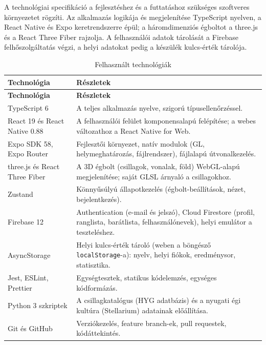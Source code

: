 \documentclass[12pt,a4paper]{article}
\newcommand{\fejlec}{\rowcolor{egkekvil}}
\newcommand{\kod}[1]{\texttt{\small #1}}
\begin{document}
A technológiai specifikáció a fejlesztéshez és a futtatáshoz szükséges szoftveres környezetet
rögzíti. Az alkalmazás logikája és megjelenítése TypeScript nyelven, a React Native és Expo
keretrendszerre épül; a háromdimenziós égboltot a three.js és a React Three Fiber rajzolja. A
felhasználói adatok tárolását a Firebase felhőszolgáltatás végzi, a helyi adatokat pedig a
készülék kulcs-érték tárolója.

{\small
\begin{longtable}{|L{4.3cm}|L{10.75cm}|}
  \caption{Felhasznált technológiák}\label{tab:tech}\\
  \hline
  \fejlec\textbf{Technológia} & \textbf{Részletek} \\ \hline
  \endfirsthead
  \hline
  \fejlec\textbf{Technológia} & \textbf{Részletek} \\ \hline
  \endhead
  TypeScript 6 & A teljes alkalmazás nyelve, szigorú típusellenőrzéssel. \\ \hline
  React 19 és React Native 0.88 & A felhasználói felület komponensalapú felépítése; a webes
  változathoz a React Native for Web. \\ \hline
  Expo SDK 58, Expo Router & Fejlesztői környezet, natív modulok (GL, helymeghatározás,
  fájlrendszer), fájlalapú útvonalkezelés. \\ \hline
  three.js és React Three Fiber & A 3D égbolt (csillagok, vonalak, föld) WebGL-alapú
  megjelenítése; saját GLSL árnyaló a csillagokhoz. \\ \hline
  Zustand & Könnyűsúlyú állapotkezelés (égbolt-beállítások, nézet, bejelentkezés). \\ \hline
  Firebase 12 & Authentication (e-mail és jelszó), Cloud Firestore (profil, ranglista,
  barátlista, felhasználónevek), helyi emulátor a teszteléshez. \\ \hline
  AsyncStorage & Helyi kulcs-érték tároló (weben a böngésző \kod{localStorage}-a): nyelv,
  helyi fiókok, eredménysor, statisztika. \\ \hline
  Jest, ESLint, Prettier & Egységtesztek, statikus kódelemzés, egységes kódformázás. \\ \hline
  Python 3 szkriptek & A csillagkatalógus (HYG adatbázis) és a nyugati égi kultúra (Stellarium)
  adatainak előállítása. \\ \hline
  Git és GitHub & Verziókezelés, feature branch-ek, pull requestek, kódáttekintés. \\ \hline
\end{longtable}
}

\end{document}
